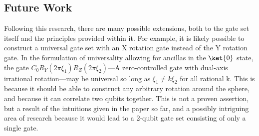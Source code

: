 \documentclass[12pt]{article}
\begin{document}
\subsection{Future Work}
Following this research, there are many possible extensions, both to the gate set itself and the principles provided within it. For example, it is likely possible to construct a universal gate set with an X rotation gate instead of the Y rotation gate. In the formulation of universality allowing for ancillas in the $\ket{0}$ state, the gate $C_0R_Y(2\pi\xi_1)R_Z(2\pi\xi_2)$---A zero-controlled gate with dual-axis irrational rotation---may be universal so long as $\xi_1 \ne k \xi_2$ for all rational k. This is because it should be able to construct any arbitrary rotation around the sphere, and because it can correlate two qubits together. This is not a proven assertion, but a result of the intuitions given in the paper so far, and a possibly intriguing area of research because it would lead to a 2-qubit gate set consisting of only a single gate.

\pagebreak
\nocite{Barenco1995, Nielsen2023}
\printbibliography
\end{document}

